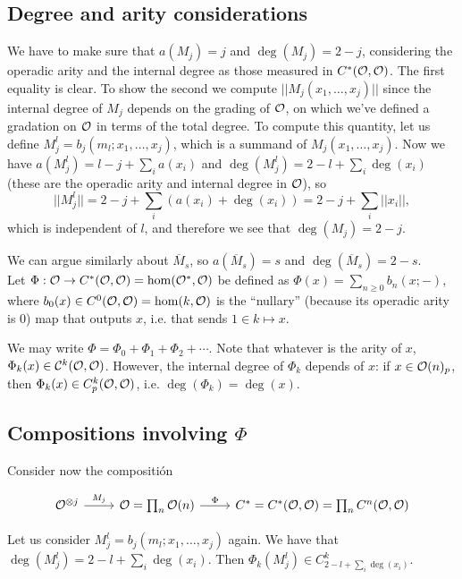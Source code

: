 \documentclass[twoside]{article}
\begin{document}
\subsection{Degree and arity considerations}

We have to make sure that $a(M_j)=j$ and $\deg(M_j)=2-j$, considering the operadic arity and the internal degree as those measured in $C^*({\mathcal O},{\mathcal O})$. The first equality is clear. To show the second we compute $||M_j(x_1,\dots, x_j)||$ since the internal degree of $M_j$ depends on the grading of ${\mathcal O}$, on which we've defined a gradation on ${\mathcal O}$ in terms of the total degree. To compute this quantity, let us define $M_j^l=b_j(m_l;x_1,\dots, x_j)$, which is a summand of $M_j(x_1,\dots, x_j)$. Now we have $a(M_j^l)=l-j+\sum_i a(x_i)$ and $\deg(M_j^l)=2-l+\sum_i \deg(x_i)$ (these are the operadic arity and internal degree in ${\mathcal O}$), so $$||M_j^l||=2-j+\sum_i(a(x_i)+\deg(x_i))=2-j+\sum_i||x_i||,$$ which is independent of $l$, and therefore we see that $\deg(M_j)=2-j$.

We can argue similarly about $\overline{M}_s$, so $a(\overline{M}_s)=s$ and $\deg(\overline{M}_s)=2-s$.\\

Let $\Phi:{\mathcal O}\to C^*({\mathcal O},{\mathcal O})=\hom({\mathcal O}^*,{\mathcal O})$ be defined as $\Phi(x)=\sum_{n\geq 0}b_n(x;-)$, where $b_0(x)\in C^0({\mathcal O},{\mathcal O})=\hom(k,{\mathcal O})$ is the ``nullary'' (because its operadic arity is 0) map that outputs $x$, i.e. that sends $1\in k\mapsto x$.  

We may write $\Phi=\Phi_0+\Phi_1+\Phi_2+\cdots$. Note that whatever is the arity of $x$, $\Phi_k(x)\in{\mathcal C}^k({\mathcal O},{\mathcal O})$. However, the internal degree of $\Phi_k$ depends of $x$: if $x\in{\mathcal O}(n)_p$, then $\Phi_k(x)\in C^k_p({\mathcal O},{\mathcal O})$, i.e. $\deg(\Phi_k)=\deg(x)$. 


\subsection{Compositions involving $\Phi$}

Consider now the compositión 

\[
\begin{tikzcd}
\OO^{\otimes j}\arrow[r, "M_j"] & \OO=\prod_n\OO(n)\arrow[r,"\Phi"] &C^*=C^*(\OO,\OO)=\prod_n C^n(\OO,\OO)
\end{tikzcd}
\]

Let us consider $M_j^l=b_j(m_l;x_1,\dots, x_j)$ again. We have that %
$\deg(M_j^l)=2-l+\sum_i \deg(x_i)$. Then $\Phi_k(M_j^l)\in C^k_{2-l+\sum_i \deg(x_i)}$.
\end{document}
